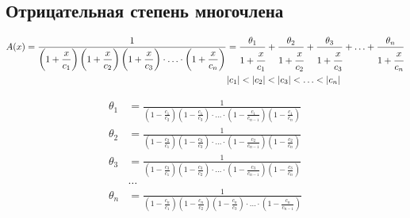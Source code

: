 
\subsection{Отрицательная степень многочлена}

\begin{equation*} \begin{aligned}
A(x) =
\frac{1}
{
  \left(1 + \displaystyle \frac{x}{c_1} \right)
  \left(1 + \displaystyle \frac{x}{c_2} \right)
  \left(1 + \displaystyle \frac{x}{c_3} \right)
  \cdot \ldots \cdot
  \left(1 + \displaystyle \frac{x}{c_n} \right)
} &
= \frac{\theta_1}{1 + \cfrac{x}{c_1}}
+ \frac{\theta_2}{1 + \cfrac{x}{c_2}}
+ \frac{\theta_3}{1 + \cfrac{x}{c_3}}
+ \ldots
+ \frac{\theta_n}{1 + \cfrac{x}{c_n}} \\
&|c_1| < |c_2| < |c_3| < \ldots < |c_n| \\
\end{aligned} \end{equation*}

\begin{equation*} \begin{aligned}
\theta_1 &= \frac{1}
{
  \left(1 - \displaystyle \frac{c_1}{c_2} \right)
  \left(1 - \displaystyle \frac{c_1}{c_3} \right)
  \cdot \ldots \cdot
  \left(1 - \displaystyle \frac{c_1}{c_{n - 1}} \right)
  \left(1 - \displaystyle \frac{c_1}{c_n} \right)
} \\
\theta_2 &= \frac{1}
{
  \left(1 - \displaystyle \frac{c_2}{c_1} \right)
  \left(1 - \displaystyle \frac{c_2}{c_3} \right)
  \cdot \ldots \cdot
  \left(1 - \displaystyle \frac{c_2}{c_{n - 1}} \right)
  \left(1 - \displaystyle \frac{c_2}{c_n} \right)
} \\
\theta_3 &= \frac{1}
{
  \left(1 - \displaystyle \frac{c_3}{c_1} \right)
  \left(1 - \displaystyle \frac{c_3}{c_2} \right)
  \cdot \ldots \cdot
  \left(1 - \displaystyle \frac{c_3}{c_{n - 1}} \right)
  \left(1 - \displaystyle \frac{c_3}{c_n} \right)
} \\
&\ldots \\
\theta_n &= \frac{1}
{
  \left(1 - \displaystyle \frac{c_n}{c_1} \right)
  \left(1 - \displaystyle \frac{c_n}{c_2} \right)
  \left(1 - \displaystyle \frac{c_n}{c_3} \right)
  \cdot \ldots \cdot
  \left(1 - \displaystyle \frac{c_n}{c_{n - 1}} \right)
} \\
\end{aligned} \end{equation*}

